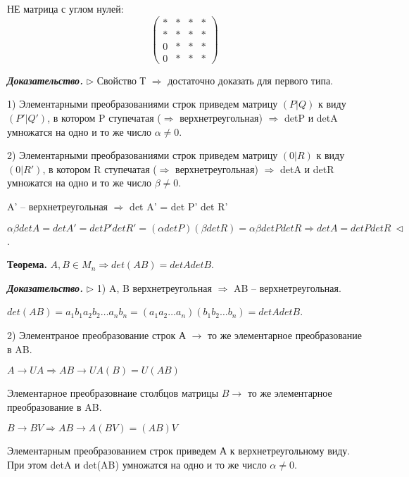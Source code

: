 НЕ матрица с углом нулей:
\begin{equation*} 
\left(
\begin{array}{c|ccc}
  * & * & * & * \\
  * & * & * & * \\
  \hline
  0 & * & * & * \\
  0 & * & * & *
\end{array}
\right)
\end{equation*}

\vspace{\baselineskip}
\textbf{\textit{Доказательство.}} $\rhd$ Свойство Т $\Rightarrow$ достаточно доказать для первого типа.

1) Элементарными преобразованиями строк приведем матрицу $(P|Q)$ к виду $(P'|Q')$, в котором P ступечатая ($\Rightarrow$ верхнетреугольная) $\Rightarrow$ detP и detA умножатся на одно и то же число $\alpha \neq 0$. 

2) Элементарными преобразованиями строк приведем матрицу $(0|R)$ к виду $(0|R')$, в котором R ступечатая ($\Rightarrow$ верхнетреугольная) $\Rightarrow$ detA и detR умножатся на одно и то же число $\beta \neq 0$. 

A' -- верхнетреугольная $\Rightarrow$ det A' = det P' det R'

$\alpha \beta det A = det A' = det P' det R' = (\alpha det P) (\beta det R) = \alpha \beta det P det R \Rightarrow det A = det P det R \ \lhd$.

\vspace{\baselineskip}
\textbf{Теорема.} $A, B \in M_n \Rightarrow det(AB) = detA detB$.

\vspace{\baselineskip}
\textbf{\textit{Доказательство.}} $\rhd$ 1) A, B верхнетреугольная $\Rightarrow$ AB -- верхнетреугольная.


$det(AB) = a_1 b_1 a_2 b_2 \dots a_n b_n = (a_1 a_2 \dots a_n)(b_1 b_2 \dots b_n) = det A det B$.

\vspace{\baselineskip}
2) Элементраное преобразование строк А $\rightarrow$ то же элементарное преобразование в AB.

$A \rightarrow UA \Rightarrow AB \rightarrow UA(B) = U(AB)$

Элементарное преобразовнаие столбцов матрицы $B \rightarrow$ то же элементарное преобразование в AB.

$B \rightarrow BV \Rightarrow AB \rightarrow A(BV) = (AB)V$

\vspace{\baselineskip}
Элементарным преобразованием строк приведем А к верхнетреугольному виду. При этом detA и det(AB) умножатся на одно и то же число $\alpha \neq 0$.

